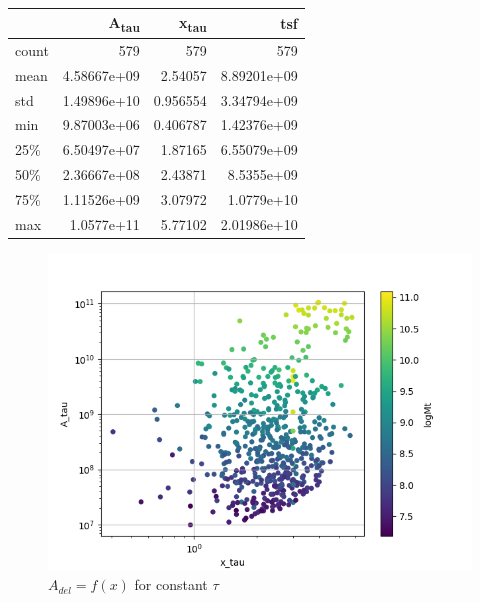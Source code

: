 \documentclass[a4paper,twocolumn]{article}
\begin{document}
\begin{center}
\begin{tabular}{lrrr}
 & A\textsubscript{tau} & x\textsubscript{tau} & tsf\\[0pt]
\hline
count & 579 & 579 & 579\\[0pt]
mean & 4.58667e+09 & 2.54057 & 8.89201e+09\\[0pt]
std & 1.49896e+10 & 0.956554 & 3.34794e+09\\[0pt]
min & 9.87003e+06 & 0.406787 & 1.42376e+09\\[0pt]
25\% & 6.50497e+07 & 1.87165 & 6.55079e+09\\[0pt]
50\% & 2.36667e+08 & 2.43871 & 8.5355e+09\\[0pt]
75\% & 1.11526e+09 & 3.07972 & 1.0779e+10\\[0pt]
max & 1.0577e+11 & 5.77102 & 2.01986e+10\\[0pt]
\end{tabular}
\end{center}

\begin{figure}[!htpb]
\centering
\includegraphics[width=.9\linewidth]{./figs/x-A_tau.png}
\caption{\label{fig:$A_{del} = f(x)$ for constant $\tau$}\(A_{del} = f(x)\) for constant \(\tau\)}
\end{figure}
\end{document}
